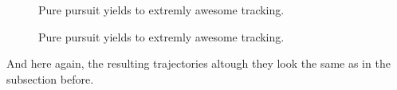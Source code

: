 \begin{figure}[h]
    \centering
    \def\svgwidth{0.5\columnwidth}
    
    \caption{Pure pursuit yields to extremly awesome tracking.}
    \label{fig:scene_purePursuit}
\end{figure}

\begin{figure}[h]
    \centering
    \def\svgwidth{\columnwidth}
    
    \caption{Pure pursuit yields to extremly awesome tracking.}
    \label{fig:purePursuit}
\end{figure}

And here again, the resulting trajectories altough they look the same as in the subsection before.

%




